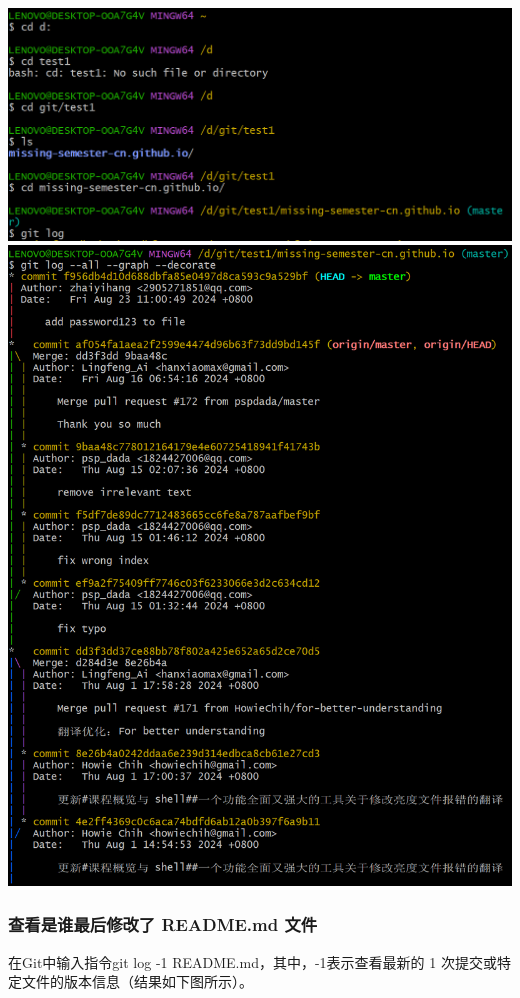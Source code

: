 \documentclass[UTF8,a4paper]{ctexart}
\begin{document}
\begin{sloppypar}
	\includegraphics[width = 16cm]{3}
	\includegraphics[width = 16cm]{4}
	
	\subsubsection{查看是谁最后修改了 README.md 文件}
	在Git中输入指令git log -1 README.md，其中，-1表示查看最新的 1 次提交或特定文件的版本信息（结果如下图所示）。
	

\end{sloppypar}
\end{document}

